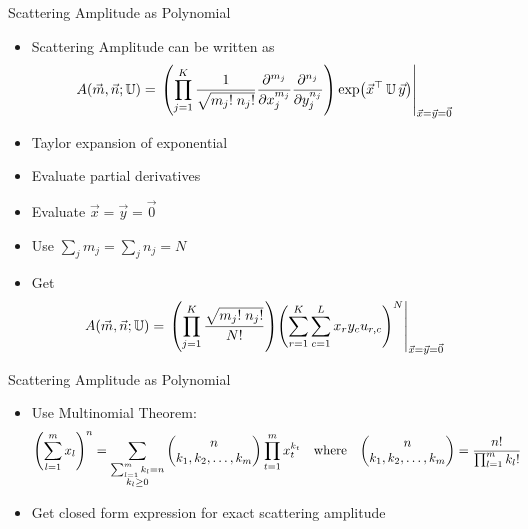
\begin{frame}{Scattering Amplitude as Polynomial}
%
\begin{itemize}
\item Scattering Amplitude can be written as
	\begin{align*}
		A(\sysArgs)
	&=
		\eval{\qty(
			\prod_{j=1}^{K}
				\frac
					{1}
					{\sqrt{m_j! \; n_j!}}
				\pdv[m_j]{x_j}
				\pdv[n_j]{y_j}
			) \exp(\vec{x}\transp \, \mathbb{U} \, \vec{y})
		}_{\vec{x} = \vec{y} = \vec{0}}
	\end{align*}
\item Taylor expansion of exponential
\item Evaluate partial derivatives
\item Evaluate $\vec{x} = \vec{y} = \vec{0}$
\item Use $\sum_j m_j = \sum_j n_j = N$
\item Get
	\begin{align*}
		A(\sysArgs)
	&=
		\eval{
			\qty(
				\prod_{j=1}^{K}
					\frac
						{\sqrt{m_j! \; n_j!}}
						{N!}
			)
			\qty( 
				\sum_{r=1}^{K}
				\sum_{c=1}^{L}
					x_r
					y_c
					u_{r,c}
			)^N
		}_{\vec{x} = \vec{y} = \vec{0}}
	\end{align*}
\end{itemize}
%
\end{frame}


\begin{frame}{Scattering Amplitude as Polynomial}
%
\begin{itemize}
\item Use Multinomial Theorem:
	\begin{align*}
		\qty(
			\sum_{l=1}^{m} x_l
		)^{n}
	&=
		\sum_{\substack{\sum_{l=1}^m k_l = n \\ k_l \geq 0}}
		\begin{pmatrix}
			n \\ k_1, k_2, \ldots, k_m
		\end{pmatrix}
		\prod_{t=1}^{m}
			x_t^{k_t}
	&
	\text{where}
	&&
		\begin{pmatrix}
			n \\ k_1, k_2, \ldots, k_m
		\end{pmatrix}
	&=
		\frac{n!}
		{\prod_{l=1}^m k_l !}
	\end{align*}
\item Get closed form expression for exact scattering amplitude
\end{itemize}
%
\end{frame}

